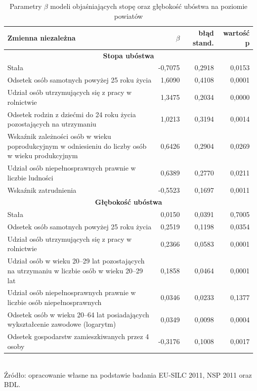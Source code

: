 \begin{table}[htp]
\centering
\caption{Parametry $\beta$ modeli objaśniających stopę oraz głębokość ubóstwa na poziomie powiatów}
\label{tab:pow_beta}
\begin{tabular}{p{10cm}rrr}
\hline
Zmienna niezależna & $\beta$ & błąd stand. & wartość p \\
\hline
\multicolumn{4}{c}{\textbf{Stopa ubóstwa}}                \\
\hline
Stała & -0,7075 & 0,2918 & 0,0153 \\
Odsetek osób samotnych powyżej 25 roku życia & 1,6090 & 0,4108 & 0,0001 \\
Udział osób utrzymujących się z pracy w rolnictwie & 1,3475 & 0,2034 & 0,0000 \\
Odsetek rodzin z dziećmi do 24 roku życia pozostających na utrzymaniu & 1,0213 & 0,3194 & 0,0014 \\
Wskaźnik zależności osób w wieku poprodukcyjnym w odniesieniu do liczby osób w wieku produkcyjnym & 0,6426 & 0,2904 & 0,0269 \\
Udział osób niepełnosprawnych prawnie w liczbie ludności & 0,6389 & 0,2770 & 0,0211 \\
Wskaźnik zatrudnienia & -0,5523 & 0,1697 & 0,0011 \\
\hline
\multicolumn{4}{c}{\textbf{Głębokość ubóstwa}}            \\
\hline
Stała & 0,0150 & 0,0391 & 0,7005 \\
Odsetek osób samotnych powyżej 25 roku życia & 0,2519 & 0,1198 & 0,0354 \\
Udział osób utrzymujących się z pracy w rolnictwie & 0,2366 & 0,0583 & 0,0001 \\
Udział osób w wieku 20--29 lat pozostających na utrzymaniu w liczbie osób w wieku 20--29 lat & 0,1858 & 0,0464 & 0,0001 \\
Udział osób niepełnosprawnych prawnie w liczbie osób niepełnosprawnych & 0,0346 & 0,0233 & 0,1377 \\
Odsetek osób w wieku 20--64 lat posiadających wykształcenie zawodowe (logarytm) & 0,0349 & 0,0098 & 0,0004 \\
Odsetek gospodarstw zamieszkiwanych przez 4 osoby & -0,3176 & 0,1008 & 0,0017 \\
\hline
\end{tabular}\\
\small{Źródło: opracowanie własne na podstawie badania EU-SILC 2011, NSP 2011 oraz BDL.}
\end{table}

